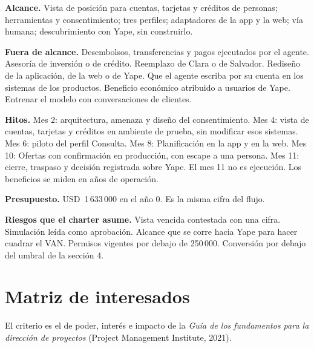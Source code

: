 \documentclass[11pt]{article}
\newcommand{\usd}[1]{USD~#1}
\begin{document}
\textbf{Alcance.} Vista de posición para cuentas, tarjetas y créditos de personas; herramientas y consentimiento; tres perfiles; adaptadores de la app y la web; vía humana; descubrimiento con Yape, sin construirlo.

\textbf{Fuera de alcance.} Desembolsos, transferencias y pagos ejecutados por el agente. Asesoría de inversión o de crédito. Reemplazo de Clara o de Salvador. Rediseño de la aplicación, de la web o de Yape. Que el agente escriba por su cuenta en los sistemas de los productos. Beneficio económico atribuido a usuarios de Yape. Entrenar el modelo con conversaciones de clientes.

\textbf{Hitos.} Mes 2: arquitectura, amenaza y diseño del consentimiento. Mes 4: vista de cuentas, tarjetas y créditos en ambiente de prueba, sin modificar esos sistemas. Mes 6: piloto del perfil Consulta. Mes 8: Planificación en la app y en la web. Mes 10: Ofertas con confirmación en producción, con escape a una persona. Mes 11: cierre, traspaso y decisión registrada sobre Yape. El mes 11 no es ejecución. Los beneficios se miden en años de operación.

\textbf{Presupuesto.} \usd{1\,633\,000} en el año 0. Es la misma cifra del flujo.

\textbf{Riesgos que el charter asume.} Vista vencida contestada con una cifra. Simulación leída como aprobación. Alcance que se corre hacia Yape para hacer cuadrar el VAN. Permisos vigentes por debajo de 250\,000. Conversión por debajo del umbral de la sección 4.

\section{Matriz de interesados}

El criterio es el de poder, interés e impacto de la \textit{Guía de los fundamentos para la dirección de proyectos} (Project Management Institute, 2021).
\end{document}
